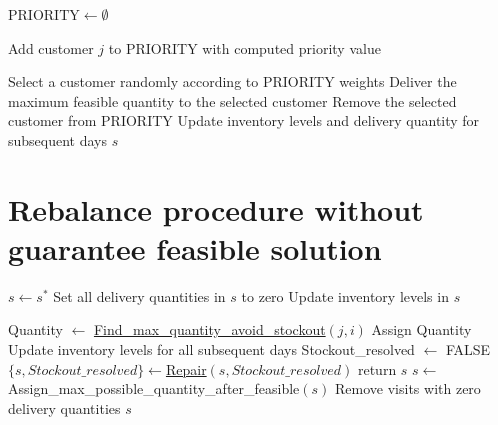 \documentclass{article}
\begin{document}
\begin{algorithm}[H]
\caption{\textbf{Assign\_max\_possible\_quantity\_after\_feasible$(s)$}} \label{alg:AssignQuantity}
\begin{algorithmic}[1]

\STATE $\text{PRIORITY} \gets \emptyset$
    
            \STATE Add customer $j$ to PRIORITY with computed priority value
        \ENDIF
    \ENDFOR
    
        \STATE Select a customer randomly according to PRIORITY weights
        \STATE Deliver the maximum feasible quantity to the selected customer
        \STATE Remove the selected customer from PRIORITY
        \STATE Update inventory levels and delivery quantity for subsequent days
    \ENDWHILE
\ENDFOR
\RETURN $s$
\end{algorithmic}
\end{algorithm}


\section{Rebalance procedure without guarantee feasible solution}\label{sec: rebalance without feasibility}



\begin{algorithm}[H]
\caption{\textbf{Destory\_And\_Rebalance$(s^*)$}} \label{alg: destroy and rebalance}
\begin{algorithmic}[1]
\STATE $s \gets s^*$
\STATE Set all delivery quantities in $s$ to zero
\STATE Update inventory levels in $s$

            \STATE Quantity $\gets $ \hyperref[alg:FindMaxQuantityAvoidStockout]{Find\_max\_quantity\_avoid\_stockout}$(j, i)$
            \STATE Assign Quantity
            \STATE Update inventory levels for all subsequent days
        \ENDIF
    \ENDFOR
\ENDFOR
\STATE Stockout\_resolved $\gets$ FALSE
\STATE $\{s,Stockout\_resolved\}\gets $\hyperref[alg:QunatityRepair]{Repair}$(s,Stockout\_resolved)$
    \STATE return $s$
\ENDIF
\STATE $s\gets$Assign\_max\_possible\_quantity\_after\_feasible$(s)$
\STATE Remove visits with zero delivery quantities
\RETURN $s$
\end{algorithmic}
\end{algorithm}
\end{document}
